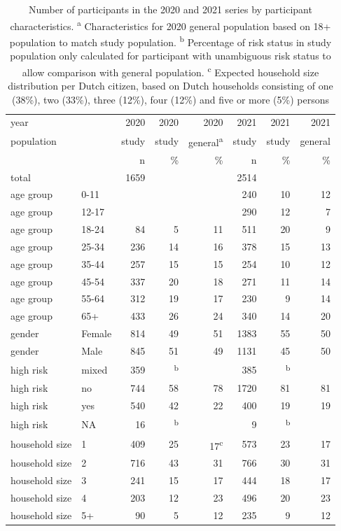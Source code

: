 \documentclass[fleqn,10pt]{wlscirep}
\begin{document}
\begin{table}[ht]
\centering
\begin{tabular}{llrrrrrr}
  \hline
 year  &  & 2020  & 2020  & 2020  & 2021 & 2021 & 2021 \\ 
population & & study & study & general\textsuperscript{a} & study & study & general \\
 &  & n & \% & \% & n & \% & \% \\ 
 \hline
 total   &  & 1659 &  &  & 2514 &  &  \\
 \hline
  age group & 0-11 &  &  &  & 240 & 10 & 12 \\ 
  age group & 12-17 &  &  &  & 290 & 12 & 7 \\ 
  age group & 18-24 & 84 & 5 & 11 & 511 & 20 & 9 \\ 
  age group & 25-34 & 236 & 14 & 16 & 378 & 15 & 13 \\ 
  age group & 35-44 & 257 & 15 & 15 & 254 & 10 & 12 \\ 
  age group & 45-54 & 337 & 20 & 18 & 271 & 11 & 14 \\ 
  age group & 55-64 & 312 & 19 & 17 & 230 & 9 & 14 \\ 
  age group & 65+ & 433 & 26 & 24 & 340 & 14 & 20 \\ 
 \hline
  gender & Female & 814 & 49 & 51 & 1383 & 55 & 50 \\ 
  gender & Male & 845 & 51 & 49 & 1131 & 45 & 50 \\ 
 \hline
  high risk & mixed & 359 & \textsuperscript{b}  &  & 385 & \textsuperscript{b} &  \\ 
  high risk & no & 744 & 58 & 78 & 1720 & 81 & 81 \\ 
  high risk & yes & 540 & 42 & 22 & 400 & 19 & 19 \\ 
  high risk & NA & 16 & \textsuperscript{b} &  & 9 & \textsuperscript{b} &  \\ 
 \hline
  household size & 1 & 409 & 25 & 17\textsuperscript{c} & 573 & 23 & 17 \\ 
  household size & 2 & 716 & 43 & 31 & 766 & 30 & 31 \\ 
  household size & 3 & 241 & 15 & 17 & 444 & 18 & 17 \\ 
  household size & 4 & 203 & 12 & 23 & 496 & 20 & 23 \\ 
  household size & 5+ & 90 & 5 & 12 & 235 & 9 & 12 \\ 
   \hline
\end{tabular}
\caption{\label{tab:part}Number of participants in the 2020 and 2021 series by participant characteristics.
 \protect\linebreak \textsuperscript{a} Characteristics for 2020 general population based on 18+ population to match study population.
 \protect\linebreak \textsuperscript{b} Percentage of risk status in study population only calculated for participant with unambiguous risk status to allow comparison with general population.
\protect\linebreak \textsuperscript{c} Expected household size distribution per Dutch citizen, based on Dutch households consisting of one (38\%), two (33\%), three (12\%), four (12\%) and five or more (5\%) persons \cite{Backer_2021}}
\end{table}
\end{document}
